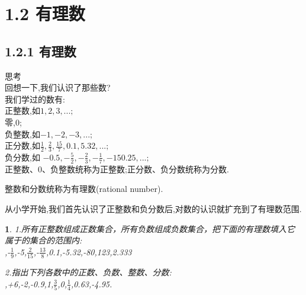 \documentclass{article}
\newtheorem{exercise}{ }
\begin{document}
	\section*{1.2 有理数}
	\subsection*{1.2.1 有理数}
	思考\\
	\indent 回想一下,我们认识了那些数?\\
	\indent 我们学过的数有:\\
	\indent 正整数,如$1,2,3,...;$\\
	\indent 零,$0$;\\
	\indent 负整数,如$-1,-2,-3,...;$\\
	\indent 正分数,如$\frac{1}{2},\frac{2}{3},\frac{15}{7},0.1,5.32,...;$\\
	\indent 负分数,如 $-0.5,-\frac{5}{2},-\frac{2}{3},-\frac{1}{7},-150.25,...;$\\
	\indent 正整数、0、负整数统称为正整数;正分数、负分数统称为分数.\\
		\begin{definition}
			整数和分数统称为有理数(rational number).\\
		\end{definition}

	\indent 从小学开始,我们首先认识了正整数和负分数后,对数的认识就扩充到了有理数范围.\\
	
		\begin{exercise}
			1.所有正整数组成正数集合，所有负数组成负数集合，把下面的有理数填入它属于的集合的范围内:\\
			,-$\frac{1}{9}$,-5,$\frac{2}{15}$,-$\frac{13}{8}$,0.1,-5.32,-80,123,2.333\\
			
			
			2.指出下列各数中的正数、负数、整数、分数:\\
			,+6,-2,-0.9,1,$\frac{3}{5}$,0,$\frac{1}{4}$,0.63,-4.95.\\
		\end{exercise}
	
\end{document}
